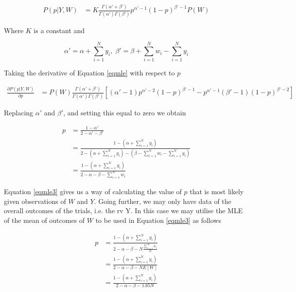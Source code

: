 \documentclass{article}
\begin{document}
\begin{flushleft}
\begin{equation} \label{eqmle}
\begin{split}
P(p|Y,W) & = K \frac{\Gamma(\alpha'+\beta')}{\Gamma(\alpha')\Gamma(\beta')} p^{\alpha'-1}(1-p)^{\beta'-1} P(W)
\end{split}
\end{equation}

Where $K$ is a constant and

$$\alpha' = \alpha + \sum_{i=1}^N y_i,\; \beta' = \beta + \sum_{i=1}^N w_i - \sum_{i=1}^N y_i$$

Taking the derivative of Equation \ref{eqmle} with respect to $p$

\begin{equation} \label{eqmle2}
\begin{split}
\frac{\partial P(p|Y,W)}{\partial p} & = P(W) \frac{\Gamma(\alpha' + \beta')}{\Gamma(\alpha')\Gamma(\beta')} \left[  (\alpha' - 1)p^{\alpha'-2} (1-p)^{\beta'-1} - p^{\alpha'-1}(\beta'-1)(1-p)^{\beta'-2}  \right]
\end{split}
\end{equation}

Replacing $\alpha'$ and $\beta'$, and setting this equal to zero we obtain

\begin{equation} \label{eqmle3}
\begin{split}
p &= \frac{1-\alpha'}{2-\alpha'-\beta'} \\
&= \frac{1-(\alpha + \sum_{i=1}^N y_i)}{2-(\alpha + \sum_{i=1}^N y_i)-(\beta - \sum_{i=1}^N w_i - \sum_{i=1}^N y_i)} \\
&= \frac{1-(\alpha + \sum_{i=1}^N y_i)}{2-\alpha-\beta-\sum_{i=1}^N w_i}
\end{split}
\end{equation}

Equation \ref{eqmle3} gives us a way of calculating the value of $p$ that is most likely given observations of $W$ and $Y$. Going further, we may only have data of the overall outcomes of the trials, i.e. the rv Y. In this case we may utilise the MLE of the mean of outcomes of $W$ to be used in Equation \ref{eqmle3} as follows

\begin{equation} \label{eqmle4}
\begin{split}
p &= \frac{1-(\alpha + \sum_{i=1}^N y_i)}{2-\alpha-\beta-N \frac{\sum_{i=1}^N w_i}{N}} \\
&= \frac{1-(\alpha + \sum_{i=1}^N y_i)}{2-\alpha-\beta-N E[W]} \\
&= \frac{1-(\alpha + \sum_{i=1}^N y_i)}{2-\alpha-\beta-1.65N}
\end{split}
\end{equation}


\end{flushleft}
\end{document}
